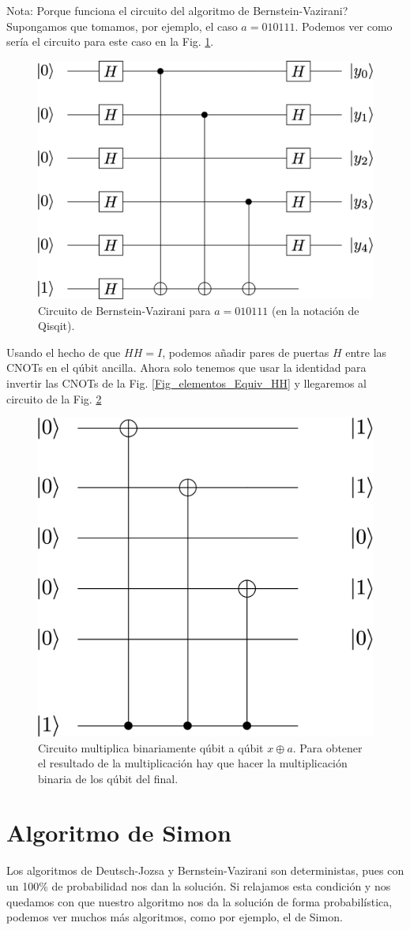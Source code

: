 \documentclass[a4paper,11pt]{book} %
\numberwithin{equation}{chapter}
\begin{document}
	\begin{mybox_blue}{Nota: Porque funciona el circuito del algoritmo de Bernstein-Vazirani?}
	Supongamos que tomamos, por ejemplo, el caso $a=010111$. Podemos ver como sería el circuito para este caso en la Fig. \ref{Fig_algoritmos_BV_circuit}.
		\begin{figure}[H]
			\centering 
			\includegraphics[width=0.3\linewidth]{Figuras/Fig_algoritmos_BV_circuit.png}
			\caption{Circuito de Bernstein-Vazirani para $a=010111$ (en la notación de Qisqit).}
			\label{Fig_algoritmos_BV_circuit}
			\end{figure}	
	
	Usando el hecho de que $HH=I$, podemos añadir pares de puertas $H$ entre las CNOTs en el qúbit ancilla. Ahora solo tenemos que usar la identidad para invertir las CNOTs
	de la Fig. \ref{Fig_elementos_Equiv_HH} y llegaremos al circuito de la Fig. \ref{Fig_algoritmos_Bernstein_Vazirani_trick}
	
		\begin{figure}[H]
		\centering 
		\includegraphics[width=0.3\linewidth]{Figuras/Fig_algoritmos_Bernstein_Vazirani_trick.png}
		\caption{Circuito multiplica binariamente qúbit a qúbit $x \oplus a$. Para obtener el resultado de la multiplicación hay que hacer la multiplicación binaria de los qúbit del final.}
		\label{Fig_algoritmos_Bernstein_Vazirani_trick}
		\end{figure}
	
	
	\end{mybox_blue}


	\section{Algoritmo de Simon}

Los algoritmos de Deutsch-Jozsa y Bernstein-Vazirani son deterministas, pues con un 100\% de probabilidad nos dan la solución. Si relajamos esta condición y nos quedamos con que nuestro algoritmo nos da la solución de forma probabilística, podemos ver muchos más algoritmos, como por ejemplo, el de Simon.
\end{document}

